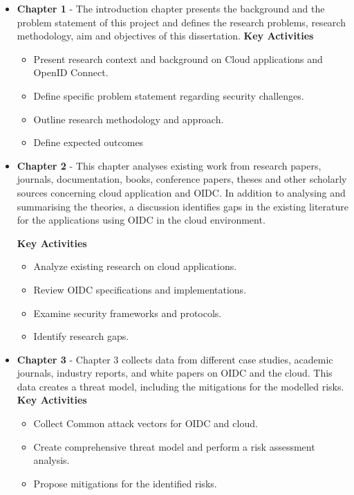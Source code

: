 \begin{itemize}
    \item \textbf{Chapter 1} - The introduction chapter presents the background and the problem statement of this project and defines the research problems, research methodology, aim and objectives of this dissertation.\newline
    \textbf{Key Activities}
    \begin{itemize}
        \item Present research context and background on Cloud applications and OpenID Connect.
        \item Define specific problem statement regarding security challenges.
        \item Outline research methodology and approach.
        \item Define expected outcomes
    \end{itemize}

    \item \textbf{Chapter 2} - This chapter analyses existing work from research papers, journals, documentation, books, conference papers, theses and other scholarly sources concerning cloud application and OIDC. In addition to analysing and summarising the theories, a discussion identifies gaps in the existing literature for the applications using OIDC in the cloud environment.\newline

    \textbf{Key Activities}
    \begin{itemize}
        \item Analyze existing research on cloud applications.
        \item Review OIDC specifications and implementations.
        \item Examine security frameworks and protocols.
        \item Identify research gaps.
    \end{itemize}
    
    \item \textbf{Chapter 3} - Chapter 3 collects data from different case studies, academic journals, industry reports, and white papers on OIDC and the cloud. This data creates a threat model, including the mitigations for the modelled risks. \newline
    \textbf{Key Activities}
    \begin{itemize}
        \item Collect Common attack vectors for OIDC and cloud.
        \item Create comprehensive threat model and perform a risk assessment analysis.
        \item Propose mitigations for the identified risks.
    \end{itemize}
    

\end{itemize}
